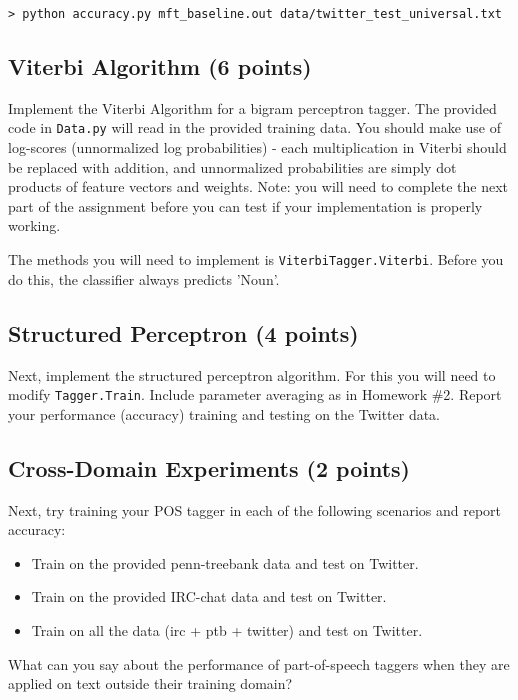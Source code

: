 \documentclass[12pt, letterpaper]{article}
\begin{document}
\begin{verbatim}
> python accuracy.py mft_baseline.out data/twitter_test_universal.txt
\end{verbatim}

\subsection*{Viterbi Algorithm (6 points)}
Implement the Viterbi Algorithm for a bigram perceptron tagger.  The provided code in {\tt Data.py} will read in the provided training data.
You should make use of log-scores (unnormalized log probabilities) - each multiplication in Viterbi should
be replaced with addition, and unnormalized probabilities are simply dot products of feature vectors and weights.
Note: you will need to complete the next part of the assignment before you can test if your implementation is properly working.

The methods you will need to implement is {\tt ViterbiTagger.Viterbi}.  Before you do this, the classifier always predicts 'Noun'.

\subsection*{Structured Perceptron (4 points)}
Next, implement the structured perceptron algorithm.  For this you will need to modify {\tt Tagger.Train}.  Include
parameter averaging as in Homework \#2.
Report your performance (accuracy) training and testing on the Twitter data.

\subsection*{Cross-Domain Experiments (2 points)}
Next, try training your POS tagger in each of the following scenarios and report accuracy:

\begin{itemize}
  \item Train on the provided penn-treebank data and test on Twitter.
  \item Train on the provided IRC-chat data and test on Twitter.
  \item Train on all the data (irc + ptb + twitter) and test on Twitter.
\end{itemize}

What can you say about the performance of part-of-speech taggers when they are applied on text outside their
training domain?
\end{document}
